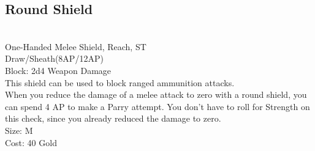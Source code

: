 \subsection{Round Shield}\label{weapon:roundShield}\\
One-Handed Melee Shield,  Reach, ST\\
Draw/Sheath(8AP/12AP)\\
Block: 2d4 Weapon Damage\\
This shield can be used to block ranged ammunition attacks.\\
When you reduce the damage of a melee attack to zero with a round shield, you can spend 4 AP to make a Parry attempt.
You don't have to roll for Strength on this check, since you already reduced the damage to zero.\\
Size: M\\
Cost: 40 Gold\\